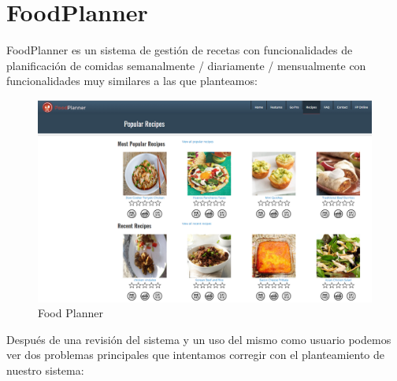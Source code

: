 \documentclass[12pt, a4paper, twoside]{book}
\begin{document}
	\section{FoodPlanner}
	FoodPlanner es un sistema de gestión de recetas con funcionalidades de planificación de comidas semanalmente / diariamente / mensualmente con funcionalidades muy similares a las que planteamos:
	\begin{center}
		\begin{figure}[H]
			\centering
			\includegraphics[width=15cm]{Imagenes/FoodPlanner.png}
			\caption{Food Planner}\label{Food Planner}
		\end{figure}
	\end{center}
	Después de una revisión del sistema y un uso del mismo como usuario podemos ver dos problemas principales que intentamos corregir con el planteamiento de nuestro sistema:
\end{document}
